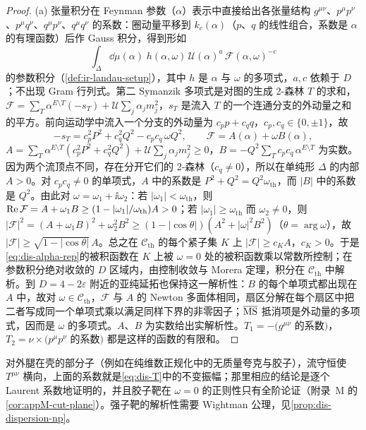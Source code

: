 \begin{proof}
(a) 张量积分在 Feynman 参数（$\alpha$）表示中直接给出各张量结构 $g^{\mu\nu}$、$p^\mu p^\nu$、$p^\mu q^\nu$、$q^\mu p^\nu$、$q^\mu q^\nu$ 的系数：圈动量平移到 $k_c(\alpha)$（$p$、$q$ 的线性组合，系数是 $\alpha$ 的有理函数）后作 Gauss 积分，得到形如
\begin{equation}\label{eq:dis-alpha-rep}
\int_{\Delta}\dd\mu(\alpha)\;h(\alpha,\omega)\,\mathcal U(\alpha)^{a}\,\mathcal F(\alpha,\omega)^{-c}
\end{equation}
的参数积分（\cref{def:ir-landau-setup}），其中 $h$ 是 $\alpha$ 与 $\omega$ 的多项式，$a,c$ 依赖于 $D$；不出现 Gram 行列式。第二 Symanzik 多项式是对图的生成 2-森林 $T$ 的求和，$\mathcal F=\sum_T\alpha^{E\setminus T}(-s_T)+\mathcal U\sum_j\alpha_jm_j^2$，$s_T$ 是流入 $T$ 的一个连通分支的外动量之和的平方。前向运动学中流入一个分支的外动量为 $c_pp+c_qq$，$c_p,c_q\in\{0,\pm1\}$，故
\[
-s_T=c_p^2P^2+c_q^2Q^2-c_pc_q\,\omega Q^2,\qquad \mathcal F=A(\alpha)+\omega B(\alpha),
\]
$A=\sum_T\alpha^{E\setminus T}(c_p^2P^2+c_q^2Q^2)+\mathcal U\sum_j\alpha_jm_j^2\ge0$，$B=-Q^2\sum_Tc_pc_q\,\alpha^{E\setminus T}$ 为实数。因为两个流顶点不同，存在分开它们的 2-森林（$c_q\neq0$），所以在单纯形 $\Delta$ 的内部 $A>0$。对 $c_pc_q\ne0$ 的单项式，$A$ 中的系数是 $P^2+Q^2=Q^2\omega_{\mathrm{th}}$，而 $|B|$ 中的系数是 $Q^2$。由此对 $\omega=\omega_1+\ii\omega_2$：若 $|\omega_1|<\omega_{\mathrm{th}}$，则 $\operatorname{Re}\mathcal F=A+\omega_1B\ge(1-|\omega_1|/\omega_{\mathrm{th}})A>0$；若 $|\omega_1|\ge\omega_{\mathrm{th}}$ 而 $\omega_2\ne0$，则 $|\mathcal F|^2=(A+\omega_1B)^2+\omega_2^2B^2\ge(1-|\cos\theta|)(A^2+|\omega|^2B^2)$（$\theta=\arg\omega$），故 $|\mathcal F|\ge\sqrt{1-|\cos\theta|}\,A$。总之在 $\mathcal C_{\mathrm{th}}$ 的每个紧子集 $K$ 上 $|\mathcal F|\ge c_KA$，$c_K>0$。于是\cref{eq:dis-alpha-rep}的被积函数在 $K$ 上被 $\omega=0$ 处的被积函数乘以常数所控制；在参数积分绝对收敛的 $D$ 区域内，由控制收敛与 Morera 定理，积分在 $\mathcal C_{\mathrm{th}}$ 中解析。到 $D=4-2\varepsilon$ 附近的亚纯延拓也保持这一解析性：$B$ 的每个单项式都出现在 $A$ 中，故对 $\omega\in\mathcal C_{\mathrm{th}}$，$\mathcal F$ 与 $A$ 的 Newton 多面体相同，扇区分解在每个扇区中把二者写成同一个单项式乘以满足同样下界的非零因子；$\overline{\rm MS}$ 抵消项是外动量的多项式，因而是 $\omega$ 的多项式。$A$、$B$ 为实数给出实解析性。$T_1=-(g^{\mu\nu}$ 的系数$)$，$T_2=\nu\times(p^\mu p^\nu$ 的系数$)$ 都是这样的函数的有限和。
\end{proof}

对外腿在壳的部分子（例如在纯维数正规化中的无质量夸克与胶子），流守恒使 $T^{\mu\nu}$ 横向，上面的系数就是\cref{eq:dis-T}中的不变振幅；那里相应的结论是逐个 Laurent 系数地证明的，并且胶子靶在 $\omega=0$ 的正则性只有全阶论证（附录~M 的\cref{cor:appM-cut-plane}）。强子靶的解析性需要 Wightman 公理，见\cref{prop:dis-dispersion-np}。

